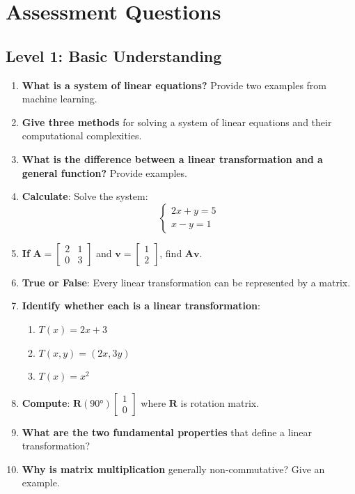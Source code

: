 \documentclass[12pt,a4paper]{article}
\theoremstyle{definition}
\begin{document}
\newpage

\section{Assessment Questions}

\subsection{Level 1: Basic Understanding}

\begin{enumerate}
\item \textbf{What is a system of linear equations?} Provide two examples from machine learning.

\item \textbf{Give three methods} for solving a system of linear equations and their computational complexities.

\item \textbf{What is the difference between a linear transformation and a general function?} Provide examples.

\item \textbf{Calculate}: Solve the system:
\[
\begin{cases}
2x + y = 5 \\
x - y = 1
\end{cases}
\]

\item \textbf{If} $\mathbf{A} = \begin{bmatrix} 2 & 1 \\ 0 & 3 \end{bmatrix}$ and $\mathbf{v} = \begin{bmatrix} 1 \\ 2 \end{bmatrix}$, find $\mathbf{Av}$.

\item \textbf{True or False}: Every linear transformation can be represented by a matrix.

\item \textbf{Identify whether each is a linear transformation}:
\begin{enumerate}[label=(\alph*)]
\item $T(x) = 2x + 3$
\item $T(x, y) = (2x, 3y)$
\item $T(x) = x^2$
\end{enumerate}

\item \textbf{Compute}: $\mathbf{R}(90°)\begin{bmatrix} 1 \\ 0 \end{bmatrix}$ where $\mathbf{R}$ is rotation matrix.

\item \textbf{What are the two fundamental properties} that define a linear transformation?

\item \textbf{Why is matrix multiplication} generally non-commutative? Give an example.
\end{enumerate}
\end{document}
